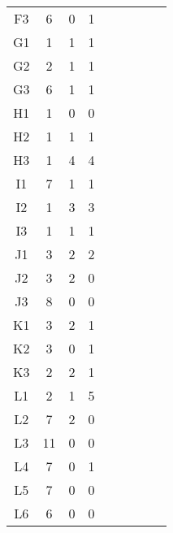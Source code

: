 \begin{center}
\begin{longtable}{ccccc|cccc}
    F3    & 6     & 0     & 1 \\
    G1    & 1     & 1     & 1 \\
    G2    & 2     & 1     & 1 \\
    G3    & 6     & 1     & 1 \\
    H1    & 1     & 0     & 0 \\
    H2    & 1     & 1     & 1 \\
    H3    & 1     & 4     & 4 \\
    I1    & 7     & 1     & 1 \\
    I2    & 1     & 3     & 3 \\
    I3    & 1     & 1     & 1 \\
    J1    & 3     & 2     & 2 \\
    J2    & 3     & 2     & 0 \\
    J3    & 8     & 0     & 0 \\
    K1    & 3     & 2     & 1 \\
    K2    & 3     & 0     & 1 \\
    K3    & 2     & 2     & 1 \\
    L1    & 2     & 1     & 5 \\
    L2    & 7     & 2     & 0 \\
    L3    & 11    & 0     & 0 \\
    L4    & 7     & 0     & 1 \\
    L5    & 7     & 0     & 0 \\
    L6    & 6     & 0     & 0 \\

\end{longtable}
\end{center}

